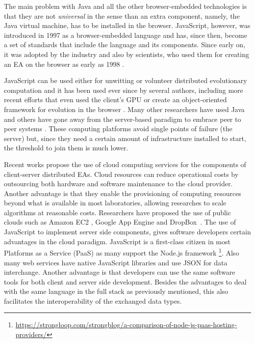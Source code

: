 \documentclass[journal,onecolumn]{IEEEtran}
\begin{document}
The main problem with Java and all the other browser-embedded
technologies is that they are not {\em universal} in the
sense than an extra component, namely, the Java virtual machine, has
to be installed in the browser. JavaScript, however,
\cite{flanagan2006javascript} was introduced in 1997 as a
browser-embedded language and has, since then, become a set of standards
\cite{ECMA-262} that include the language and its components. Since
early on, it was adopted by the industry and also by scientists,
who used them for creating an EA on
the browser as early as 1998 \cite{jj-ppsn98}. 

JavaScript can be used either for unwitting
\cite{unwitting-ec} or volunteer
\cite{langdon:2005:metas,gecco07:workshop:dcor} distributed
evolutionary computation and it has been used ever since by several
authors, including more recent efforts \cite{Desell:2008:AHG:1389095.1389273,duda2013distributed,DBLP:journals/corr/abs-0801-1210} that even
used the client's GPU \cite{duda2013gpu} or create an object-oriented
framework for evolution in the browser \cite{EvoStar2014:jsEO}. Many other researchers have
used Java \cite{chong:1999:jDGPi} and others have gone away from the
server-based paradigm to embrace peer to peer systems
\cite{jin2006constructing,10.1109/ICICSE.2008.99,DBLP:conf/3pgcic/GuervosMFEL12}. These computing
platforms avoid single points of failure (the server) but, since they
need a certain amount of infrastructure installed to start, the
threshold to join them is much lower. 

Recent works propose the use of cloud computing services for the components of 
client-server distributed EAs. Cloud resources 
can reduce operational costs by outsourcing both hardware and software maintenance 
to the cloud provider. Another advantage is that they enable the provisioning of computing resources beyond what 
is available in most laboratories, allowing researches to 
scale algorithms at reasonable costs. Researchers have proposed the use of 
public clouds such as Amazon EC2 \cite{CloudScale}, Google App Engine\cite{di2013towards} 
and DropBox~\cite{mericloud}. The use of JavaScript to implement server side components, %
gives software developers certain advantages in the cloud paradigm. JavaScript is a first-class citizen
in most Platforms as a Service (PaaS) as many support the Node.js framework 
\footnote{\url{https://strongloop.com/strongblog/a-comparison-of-node-js-paas-hosting-providers/}}. Also many web services %
have native JavaScript libraries and use JSON for data interchange. Another advantage is that 
developers can use the same software tools for both client and server side development. 
Besides the advantages to deal with the same language in the full stack as previously mentioned, 
this also facilitates the interoperability of the exchanged data types.
\end{document}

